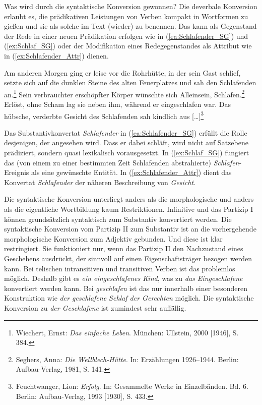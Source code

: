Was wird durch die syntaktische Konversion gewonnen? Die deverbale Konversion erlaubt es, die prädikativen Leistungen von Verben kompakt in Wortformen zu gießen und sie als solche im Text (wieder) zu benennen. Das kann als Gegenstand der Rede in einer neuen Prädikation erfolgen wie in (\ref{ea:Schlafender_SG}) und (\ref{ex:Schlaf_SG}) oder der Modifikation eines Redegegenstandes als Attribut wie in (\ref{ex:Schlafender_Attr}) dienen.  

\ea \label{ea:Konverate_Redegegenstände}
\ea \label{ea:Schlafender_SG} Am anderen Morgen ging er leise vor die Rohrhütte, in der sein Gast schlief, setzte sich auf die dunklen Steine des alten Feuerplatzes und sah den Schlafenden an.\footnote{Wiechert, Ernst: \textit{Das einfache Leben}. München: Ullstein, 2000 [1946], S. 384.}
\ex \label{ex:Schlaf_SG} Sein verbrauchter erschöpfter Körper wünschte sich Alleinsein, Schlafen.\footnote{Seghers, Anna: \textit{Die Wellblech-Hütte}. In: Erzählungen 1926--1944. Berlin: Aufbau-Verlag, 1981, S. 141.}
\ex \label{ex:Schlafender_Attr} Erlöst, ohne Scham lag sie neben ihm, während er eingeschlafen war. Das hübsche, verderbte Gesicht des Schlafenden sah kindlich aus [\ldots{}]\footnote{Feuchtwanger, Lion: \textit{Erfolg}. In: Gesammelte Werke in Einzelbänden. Bd. 6. Berlin: Aufbau-Verlag, 1993 [1930], S. 433. }
\z 
\z 

Das Substantivkonvertat \textit{Schlafender} in (\ref{ea:Schlafender_SG}) erfüllt die Rolle desjenigen, der angesehen wird. Dass er dabei schläft, wird nicht auf Satzebene prädiziert, sondern quasi lexikalisch vorausgesetzt. In (\ref{ex:Schlaf_SG}) fungiert das (von einem zu einer bestimmten Zeit Schlafenden abstrahierte) \textit{Schlafen}-Ereignis als eine gewünschte Entität. In (\ref{ex:Schlafender_Attr}) dient das Konvertat \textit{Schlafender} der näheren Beschreibung von \textit{Gesicht}.     

Die syntaktische Konversion unterliegt anders als die morphologische und anders als die eigentliche Wortbildung kaum Restriktionen. Infinitive und das Partizip I können grundsätzlich syntaktisch zum Substantiv konvertiert werden. Die syntaktische Konversion vom Partizip II zum Substantiv ist an die vorhergehende morphologische Konversion zum Adjektiv gebunden. Und diese ist klar restringiert. Sie funktioniert nur, wenn das Partizip II den Nachzustand eines Geschehens ausdrückt, der sinnvoll auf einen Eigenschaftsträger bezogen werden kann. Bei telischen intransitiven und transitiven Verben ist das problemlos möglich. Deshalb gibt es \textit{ein eingeschlafenes Kind}, was zu \textit{das Eingeschlafene} konvertiert werden kann. Bei \textit{geschlafen} ist das nur innerhalb einer besonderen Konstruktion wie \textit{der geschlafene Schlaf der Gerechten} möglich. Die syntaktische Konversion zu \textit{der Geschlafene} ist zumindest sehr auffällig. 

